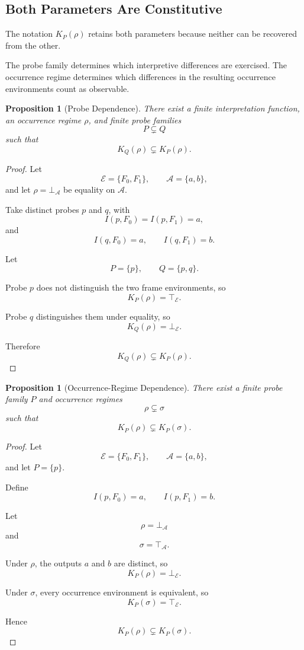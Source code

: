 \documentclass[11pt]{article}
\theoremstyle{plain}
\newtheorem{proposition}[theorem]{Proposition}
\theoremstyle{definition}
\theoremstyle{remark}
\begin{document}
\subsection{Both Parameters Are Constitutive}

The notation \(K_P(\rho)\)
retains both parameters because neither can be recovered from the other.

The probe family determines
which interpretive differences are exercised.
The occurrence regime determines
which differences in the resulting occurrence environments
count as observable.

\begin{proposition}[Probe Dependence]
  \label{ik.prop.probe-dependence}
  There exist a finite interpretation function,
  an occurrence regime \(\rho\),
  and finite probe families
  \[
    P\subsetneq Q
  \]
  such that
  \[
    K_Q(\rho)
    \subsetneq
    K_P(\rho).
  \]
\end{proposition}

\begin{proof}
  Let
  \[
    \mathcal{E}
    =
    \{F_0,F_1\},
    \qquad
    \mathcal{A}
    =
    \{a,b\},
  \]
  and let \(\rho=\bot_{\mathcal{A}}\)
  be equality on \(\mathcal{A}\).

  Take distinct probes \(p\) and \(q\),
  with
  \[
    I(p,F_0)=I(p,F_1)=a,
  \]
  and
  \[
    I(q,F_0)=a,
    \qquad
    I(q,F_1)=b.
  \]

  Let
  \[
    P=\{p\},
    \qquad
    Q=\{p,q\}.
  \]

  Probe \(p\) does not distinguish the two frame environments,
  so
  \[
    K_P(\rho)
    =
    \top_{\mathcal{E}}.
  \]

  Probe \(q\) distinguishes them under equality,
  so
  \[
    K_Q(\rho)
    =
    \bot_{\mathcal{E}}.
  \]

  Therefore
  \[
    K_Q(\rho)
    \subsetneq
    K_P(\rho).
  \]
\end{proof}

\begin{proposition}[Occurrence-Regime Dependence]
  \label{ik.prop.regime-dependence}
  There exist a finite probe family \(P\)
  and occurrence regimes
  \[
    \rho\subsetneq\sigma
  \]
  such that
  \[
    K_P(\rho)
    \subsetneq
    K_P(\sigma).
  \]
\end{proposition}

\begin{proof}
  Let
  \[
    \mathcal{E}
    =
    \{F_0,F_1\},
    \qquad
    \mathcal{A}
    =
    \{a,b\},
  \]
  and let \(P=\{p\}\).

  Define
  \[
    I(p,F_0)=a,
    \qquad
    I(p,F_1)=b.
  \]

  Let
  \[
    \rho=\bot_{\mathcal{A}}
  \]
  and
  \[
    \sigma=\top_{\mathcal{A}}.
  \]

  Under \(\rho\),
  the outputs \(a\) and \(b\) are distinct,
  so
  \[
    K_P(\rho)
    =
    \bot_{\mathcal{E}}.
  \]

  Under \(\sigma\),
  every occurrence environment is equivalent,
  so
  \[
    K_P(\sigma)
    =
    \top_{\mathcal{E}}.
  \]

  Hence
  \[
    K_P(\rho)
    \subsetneq
    K_P(\sigma).
  \]
\end{proof}
\end{document}
